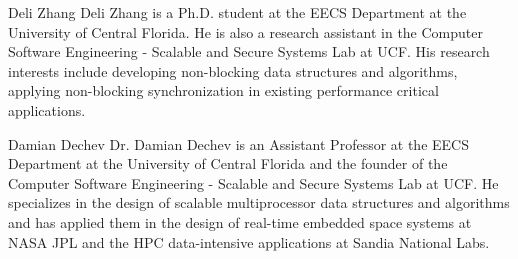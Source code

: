 \documentclass[10pt,journal,letter,compsoc]{IEEEtran}
\begin{document}
\begin{IEEEbiography}{Deli Zhang}
Deli Zhang is a Ph.D. student at the EECS Department at the University of Central Florida. He is also a research assistant in the Computer Software Engineering - Scalable and Secure Systems Lab at UCF. His research interests include developing non-blocking data structures and algorithms, applying non-blocking synchronization in existing performance critical applications.
\end{IEEEbiography}
\begin{IEEEbiography}{Damian Dechev}
Dr. Damian Dechev is an Assistant Professor at the EECS Department at the University of Central Florida and the founder of the Computer Software Engineering - Scalable and Secure Systems Lab at UCF. He specializes in the design of scalable multiprocessor data structures and algorithms and has applied them in the design of real-time embedded space systems at NASA JPL and the HPC data-intensive applications at Sandia National Labs. 
\end{IEEEbiography}

\vfill
\end{document}
